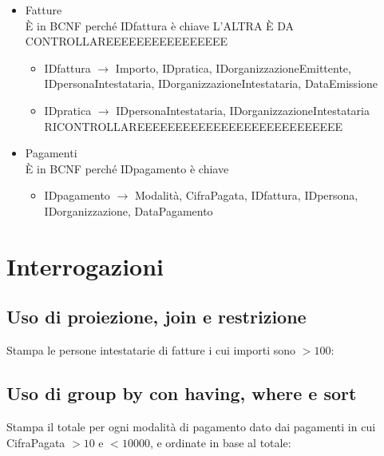 \documentclass[a4paper,12pt]{article}
\begin{document}
\begin{itemize}
\item Fatture\\È in BCNF perché IDfattura è chiave L'ALTRA È DA CONTROLLAREEEEEEEEEEEEEEEE

\begin{itemize}
\item IDfattura $\rightarrow$ Importo, IDpratica, IDorganizzazioneEmittente, IDpersonaIntestataria, IDorganizzazioneIntestataria, DataEmissione

\item IDpratica $\rightarrow$ IDpersonaIntestataria, IDorganizzazioneIntestataria RICONTROLLAREEEEEEEEEEEEEEEEEEEEEEEEEEE
\end{itemize}

\item Pagamenti\\È in BCNF perché IDpagamento è chiave

\begin{itemize}
\item IDpagamento $\rightarrow$ Modalità, CifraPagata, IDfattura, IDpersona, IDorganizzazione, DataPagamento
\end{itemize}

\end{itemize}

 \section{ Interrogazioni }


 \subsection{ Uso di proiezione, join e restrizione }
Stampa le persone intestatarie di fatture i cui importi sono $> 100$:

\begin{minipage}{\textwidth}

\end{minipage}


 \subsection{ Uso di group by con having, where e sort }

Stampa il totale per ogni modalità di pagamento dato dai pagamenti in cui CifraPagata $> 10$ e $< 10000$, e ordinate in base al totale:

\begin{minipage}{\textwidth}

\end{minipage}
\end{document}
